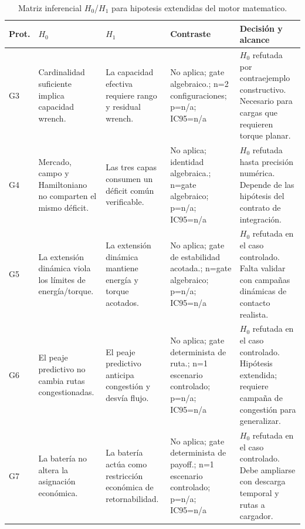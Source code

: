 \begin{table}[H]
\centering
\caption{Matriz inferencial $H_0$/$H_1$ para hipotesis extendidas del motor matematico.}
\label{tab:hypothesis-decision-extended}
\scriptsize
\begin{tabularx}{\textwidth}{@{}>{\raggedright\arraybackslash}p{}>{\raggedright\arraybackslash}p{}>{\raggedright\arraybackslash}p{}>{\raggedright\arraybackslash}p{}>{\raggedright\arraybackslash}X@{}}
\toprule
Prot. & $H_0$ & $H_1$ & Contraste & Decisión y alcance \\
\midrule
G3 & Cardinalidad suficiente implica capacidad wrench. & La capacidad efectiva requiere rango y residual wrench. & No aplica; gate algebraico.; n=2 configuraciones; p=n/a; IC95=n/a & $H_0$ refutada por contraejemplo constructivo. Necesario para cargas que requieren torque planar. \\
G4 & Mercado, campo y Hamiltoniano no comparten el mismo déficit. & Las tres capas consumen un déficit común verificable. & No aplica; identidad algebraica.; n=gate algebraico; p=n/a; IC95=n/a & $H_0$ refutada hasta precisión numérica. Depende de las hipótesis del contrato de integración. \\
G5 & La extensión dinámica viola los límites de energía/torque. & La extensión dinámica mantiene energía y torque acotados. & No aplica; gate de estabilidad acotada.; n=gate algebraico; p=n/a; IC95=n/a & $H_0$ refutada en el caso controlado. Falta validar con campañas dinámicas de contacto realista. \\
G6 & El peaje predictivo no cambia rutas congestionadas. & El peaje predictivo anticipa congestión y desvía flujo. & No aplica; gate determinista de ruta.; n=1 escenario controlado; p=n/a; IC95=n/a & $H_0$ refutada en el caso controlado. Hipótesis extendida; requiere campaña de congestión para generalizar. \\
G7 & La batería no altera la asignación económica. & La batería actúa como restricción económica de retornabilidad. & No aplica; gate determinista de payoff.; n=1 escenario controlado; p=n/a; IC95=n/a & $H_0$ refutada en el caso controlado. Debe ampliarse con descarga temporal y rutas a cargador. \\
\bottomrule
\end{tabularx}
\end{table}

